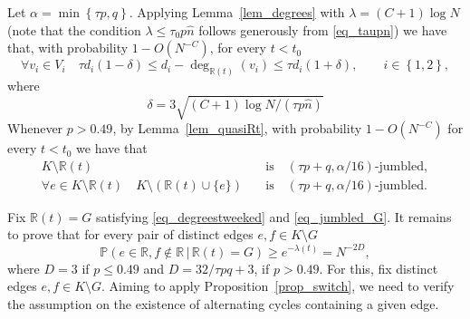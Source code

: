 \documentclass[12pt,reqno]{amsart}
\newcommand{\Prob} {\mathbb {P}}
\newcommand{\prob}[1]{\Prob\left(#1\right)}
\newcommand{\Pc}[2]{\prob{#1\,|\,#2}}
\newcommand{\R} {\mathbb R}
\theoremstyle{definition}
\begin{document}
Let $\alpha = \min \left\{ \tau p, q \right\}$. 
Applying Lemma~\ref{lem_degrees} with $\lambda = (C + 1)\log N$ (note that the condition $\lambda \le \tau_0p\hat n$ follows generously from \eqref{eq_taupn}) we have that, with probability $1 - O(N^{-C})$, for every $t < t_0$
\begin{equation}\label{eq_degreestweeked}
  \forall v_i \in V_i \quad \tau d_i (1 - \delta) \le d_i - \deg_{\R(t)}(v_i) \le \tau d_i (1 + \delta), \qquad i \in \left\{ 1,2 \right\},
\end{equation}
where
\[
  \delta = 3\sqrt{(C+1) \log N/(\tau p\hat n )}
\]
Whenever $p > 0.49$, by Lemma~\ref{lem_quasiRt}, with probability $1 - O(N^{-C})$ for every $t < t_0$ we have that
\begin{equation}
\label{eq_jumbled_G}
\begin{split}
  K \setminus \R(t) \quad &\text{is} \quad(\tau p + q, \alpha/16)\text{-jumbled}, \\
  \forall e \in K \setminus \R(t) \quad  K \setminus (\R(t)  \cup \{e\}) \quad &\text{is} \quad(\tau p + q, \alpha/16)\text{-jumbled}.
\end{split}
\end{equation}

Fix $\R(t) = G$ satisfying \eqref{eq_degreestweeked} and \eqref{eq_jumbled_G}. It remains to prove that for every pair of distinct edges $e, f \in K \setminus G$
\begin{equation}
  \label{eq_ef_G}
  \Pc{e \in \R, f \notin \R}{\R(t) = G} \ge e^{ - \lambda(t) } = N^{-2D},
\end{equation}
where $D = 3$ if $p \le 0.49$ and $D = 32/\tau p q + 3$, if $p > 0.49$.
For this, fix distinct edges $e,f\in K\setminus G$.
Aiming to apply Proposition~\ref{prop_switch},  we need to verify the assumption on the existence of alternating cycles containing a given edge.
\end{document}

